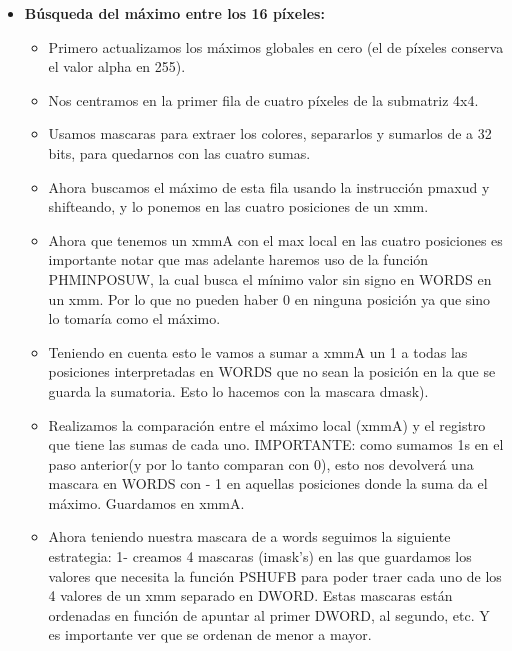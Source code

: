 \documentclass[a4paper]{article}
\begin{document}
\begin{itemize}
\itemsep=0pt
    \item \textbf{Búsqueda del máximo entre los 16 píxeles:}\\
    \begin{itemize}
      \setlength\itemsep{0em}

     \item Primero actualizamos los máximos globales en cero (el de píxeles conserva el valor alpha en 255). \\
    \item Nos centramos en la primer fila de cuatro píxeles de la submatriz 4x4.\\
    \item Usamos mascaras para extraer los colores, separarlos y sumarlos de a 32 bits, para quedarnos con las cuatro sumas.\\
    \item Ahora buscamos el máximo de esta fila usando la instrucción pmaxud y shifteando, y lo ponemos en las cuatro posiciones de un xmm.\\
    \item Ahora que tenemos un xmmA con el max local en las cuatro posiciones es importante notar que mas adelante haremos uso de la función PHMINPOSUW, la cual busca el mínimo valor sin signo en WORDS en un xmm. Por lo que no pueden haber 0 en ninguna posición ya que sino lo tomaría como el máximo.\\
    \item Teniendo en cuenta esto le vamos a sumar a xmmA un 1 a todas las posiciones interpretadas en WORDS que no sean la posición en la que se guarda la sumatoria. Esto lo hacemos con la mascara dmask).\\
    \item Realizamos la comparación entre el máximo local (xmmA) y el registro que tiene las sumas de cada uno. IMPORTANTE: como sumamos 1s en el paso anterior(y por lo tanto comparan con 0), esto nos devolverá una mascara en WORDS con - 1 en aquellas posiciones donde la suma da el máximo. Guardamos en xmmA.\\
    \item Ahora teniendo nuestra mascara de a words seguimos la siguiente estrategia: 1- creamos 4 mascaras (imask's) en las que guardamos los valores que necesita la función PSHUFB para poder traer cada uno de los 4 valores de un xmm separado en DWORD. Estas mascaras están ordenadas en función de apuntar al primer DWORD, al segundo, etc. Y es importante ver que se ordenan de menor a mayor.\\

\end{itemize}
\end{itemize}
\end{document}
